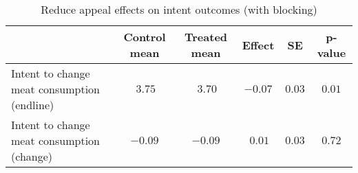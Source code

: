 \begin{table*}[ht]
\caption{Reduce appeal effects on intent outcomes (with blocking)\label{round}} 
\begin{center}
\begin{tabular}{lccccc}
\hline\hline
\multicolumn{1}{l}{}&\multicolumn{1}{c}{Control mean}&\multicolumn{1}{c}{Treated mean}&\multicolumn{1}{c}{Effect}&\multicolumn{1}{c}{SE}&\multicolumn{1}{c}{p-value}\tabularnewline
\hline
Intent to change meat consumption (endline)&$~3.75$&$~3.70$&$-0.07$&$0.03$&$0.01$\tabularnewline
Intent to change meat consumption (change)&$-0.09$&$-0.09$&$~0.01$&$0.03$&$0.72$\tabularnewline
\hline
\end{tabular}\end{center}

\end{table*}
